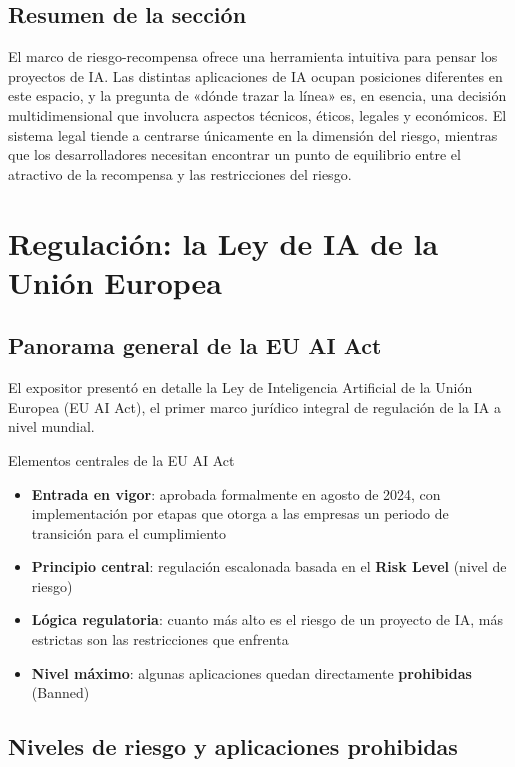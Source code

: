 \documentclass[a4paper]{article}
\begin{document}
\subsection{Resumen de la sección}

El marco de riesgo-recompensa ofrece una herramienta intuitiva para pensar los proyectos de IA. Las distintas aplicaciones de IA ocupan posiciones diferentes en este espacio, y la pregunta de «dónde trazar la línea» es, en esencia, una decisión multidimensional que involucra aspectos técnicos, éticos, legales y económicos. El sistema legal tiende a centrarse únicamente en la dimensión del riesgo, mientras que los desarrolladores necesitan encontrar un punto de equilibrio entre el atractivo de la recompensa y las restricciones del riesgo.

\section{Regulación: la Ley de IA de la Unión Europea}

\subsection{Panorama general de la EU AI Act}

El expositor presentó en detalle la Ley de Inteligencia Artificial de la Unión Europea (EU AI Act), el primer marco jurídico integral de regulación de la IA a nivel mundial.

\begin{importantbox}{Elementos centrales de la EU AI Act}
\begin{itemize}
    \item \textbf{Entrada en vigor}: aprobada formalmente en agosto de 2024, con implementación por etapas que otorga a las empresas un periodo de transición para el cumplimiento
    \item \textbf{Principio central}: regulación escalonada basada en el \textbf{Risk Level} (nivel de riesgo)
    \item \textbf{Lógica regulatoria}: cuanto más alto es el riesgo de un proyecto de IA, más estrictas son las restricciones que enfrenta
    \item \textbf{Nivel máximo}: algunas aplicaciones quedan directamente \textbf{prohibidas} (Banned)
\end{itemize}
\end{importantbox}

\subsection{Niveles de riesgo y aplicaciones prohibidas}
\end{document}
